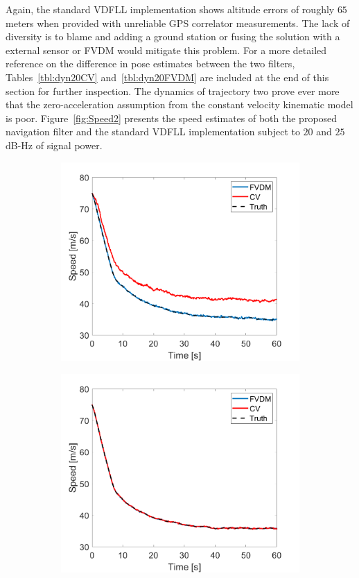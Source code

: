 Again, the standard VDFLL implementation shows altitude errors of roughly \(65\) meters when provided with unreliable GPS correlator measurements. The lack of diversity is to blame and adding a ground station or fusing the solution with a external sensor or FVDM would mitigate this problem. For a more detailed reference on the difference in pose estimates between the two filters, Tables~\ref{tbl:dyn20CV} and~\ref{tbl:dyn20FVDM} are included at the end of this section for further inspection. The dynamics of trajectory two prove ever more that the zero-acceleration assumption from the constant velocity kinematic model is poor. Figure~\ref{fig:Speed2} presents the speed estimates of both the proposed navigation filter and the standard VDFLL implementation subject to \(20\) and \(25\) dB-Hz of signal power.

\begin{figure}[!ht]
    \begin{subfigure}{.45\textwidth}
        \centering
        \includegraphics[width=1\linewidth]{Figures/dynamic/20/SPEED.png}
    \end{subfigure}
    \begin{subfigure}{.45\textwidth}
        \centering
        \includegraphics[width=1\linewidth]{Figures/dynamic/25/SPEED.png}

\end{subfigure}
\end{figure}
